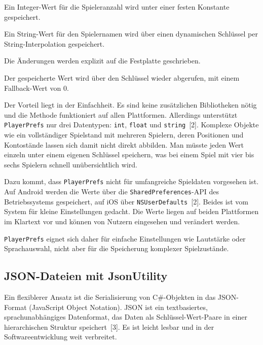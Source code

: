 \documentclass[12pt,a4paper]{article}
\begin{document}
\begin{description}[leftmargin=2em, labelwidth=1.5em]
    \item[(1)] Ein Integer-Wert für die Spieleranzahl wird unter einer festen Konstante gespeichert.
    \item[(2)] Ein String-Wert für den Spielernamen wird über einen dynamischen Schlüssel per String-Interpolation gespeichert.
    \item[(3)] Die Änderungen werden explizit auf die Festplatte geschrieben.
    \item[(4)] Der gespeicherte Wert wird über den Schlüssel wieder abgerufen, mit einem Fallback-Wert von 0.
\end{description}

Der Vorteil liegt in der Einfachheit. Es sind keine zusätzlichen Bibliotheken nötig und die Methode funktioniert auf allen Plattformen. Allerdings unterstützt \texttt{PlayerPrefs} nur drei Datentypen: \texttt{int}, \texttt{float} und \texttt{string}~[2]. Komplexe Objekte wie ein vollständiger Spielstand mit mehreren Spielern, deren Positionen und Kontostände lassen sich damit nicht direkt abbilden. Man müsste jeden Wert einzeln unter einem eigenen Schlüssel speichern, was bei einem Spiel mit vier bis sechs Spielern schnell unübersichtlich wird.

Dazu kommt, dass \texttt{PlayerPrefs} nicht für umfangreiche Spieldaten vorgesehen ist. Auf Android werden die Werte über die \texttt{SharedPreferences}-API des Betriebssystems gespeichert, auf iOS über \texttt{NSUserDefaults}~[2]. Beides ist vom System für kleine Einstellungen gedacht. Die Werte liegen auf beiden Plattformen im Klartext vor und können von Nutzern eingesehen und verändert werden.

\texttt{PlayerPrefs} eignet sich daher für einfache Einstellungen wie Lautstärke oder Sprachauswahl, nicht aber für die Speicherung komplexer Spielzustände.

\subsection{JSON-Dateien mit JsonUtility}

Ein flexiblerer Ansatz ist die Serialisierung von C\#-Objekten in das JSON-Format (JavaScript Object Notation). JSON ist ein textbasiertes, sprachunabhängiges Datenformat, das Daten als Schlüssel-Wert-Paare in einer hierarchischen Struktur speichert~[3]. Es ist leicht lesbar und in der Softwareentwicklung weit verbreitet.
\end{document}
